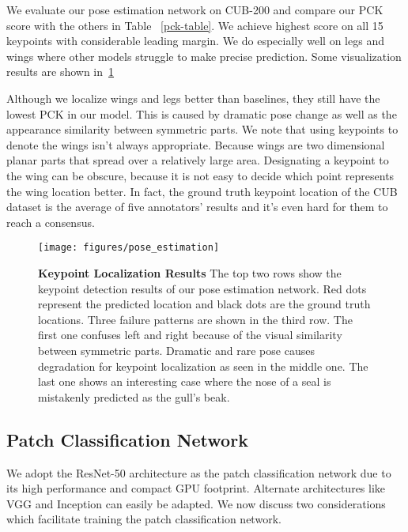 We evaluate our pose estimation network on CUB-200 and compare our PCK score with the others in Table ~\ref{pck-table}. 
We achieve highest score on all 15 keypoints with considerable leading margin.
We do especially well on legs and wings where other models struggle to make precise prediction.
Some visualization results are shown in~\ref{fig:kp_examples}

Although we localize wings and legs better than baselines, they still have the lowest PCK in our model.
This is caused by dramatic pose change as well as the appearance similarity between symmetric parts.
We note that using keypoints to denote the wings isn't always appropriate.
Because wings are two dimensional planar parts that spread over a relatively large area.
Designating a keypoint to the wing can be obscure,
because it is not easy to decide which point represents the wing location better. 
In fact, the ground truth keypoint location of the CUB dataset is the average of five annotators' results and 
it's even hard for them to reach a consensus. 


\begin{figure}[h]
        \centering
\texttt{[image: figures/pose\_estimation]}
        \label{fig:kp_examples}
        \caption{ {\textbf{Keypoint Localization Results}}
        The top two rows show the keypoint detection results of our pose estimation network. Red dots represent the predicted location and black dots are the ground truth locations. Three failure patterns are shown in the third row. The first one confuses left and right because of the visual similarity between symmetric parts. Dramatic and rare pose causes degradation for keypoint localization as seen in the middle one. The last one shows an interesting case where the nose of a seal is mistakenly predicted as the gull's beak.
         }
\end{figure}



\subsection{Patch Classification Network} \label{sec:patch_network}
We adopt the ResNet-50 architecture as the patch classification network due to its high performance and compact GPU footprint.
Alternate architectures like VGG and Inception can easily be adapted. 
We now discuss two considerations which facilitate training the patch classification network.

